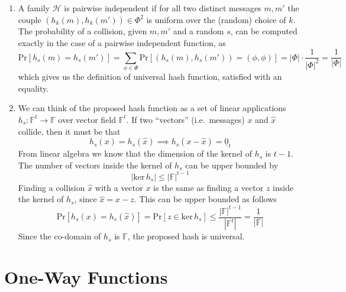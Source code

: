 \documentclass{article}
\newcommand{\hash}{\mathcal{H}}
\newcommand{\field}{\mathbb{F}}
\newcommand{\zero}{\underline{0}}
\renewcommand{\ker}{\ensuremath{\mathrm{ker}\,}}
\renewcommand{\Pr}[1]{\ensuremath{\mathrm{Pr} \left[ {#1} \right]}}
\newcommand{\abs}[1]{\left| {#1} \right|}
\begin{document}
\begin{enumerate}
	\item A family $\hash$ is pairwise independent if for all two distinct messages $m, m'$ the couple $(h_k(m), h_k(m')) \in \Phi^2$ is uniform over the (random) choice of $k$.
		The probability of a collision, given $m, m'$ and a random $s$, can be computed exactly in the case of a pairwise independent function, as
		\[
			\Pr{h_s(m) = h_s(m')} = \sum_{\phi \in \Phi} \Pr{(h_s(m), h_s(m')) = (\phi, \phi)} =
			\abs{\Phi} \cdot \frac{1}{\abs{\Phi}^2} = \frac{1}{\abs{\Phi}}
		\]
		which gives us the definition of universal hash function, satisfied with an equality.

	\item We can think of the proposed hash function as a set of linear applications $h_s : \field^t \to \field$ over vector field $\field^t$.
		If two ``vectors'' (i.e.\ messages) $x$ and $\hat{x}$ collide, then it must be that
		\[
			h_s(x) = h_s(\hat{x}) \implies h_s(x - \hat{x}) = \zero_t
		\]
		From linear algebra we know that the dimension of the kernel of $h_s$ is $t-1$.
		The number of vectors inside the kernel of $h_s$ can be upper bounded by
		\[
			\abs{\ker h_s} \le \abs{\field}^{t-1}
		\]
		Finding a collision $\hat{x}$ with a vector $x$ is the same as finding a vector $z$ inside the kernel of $h_s$, since $\hat{x} = x - z$.
		This can be upper bounded as follows
		\[
			\Pr{h_s(x) = h_s(\hat{x})} =
			\Pr{z \in \ker h_s} \le
			\frac{\abs{\field}^{t-1}}{\abs{\field^{t}}} =
			\frac{1}{\abs{\field}}
		\]
		Since the co-domain of $h_s$ is $\field$, the proposed hash is universal.
\end{enumerate}

\section{One-Way Functions}
\end{document}
